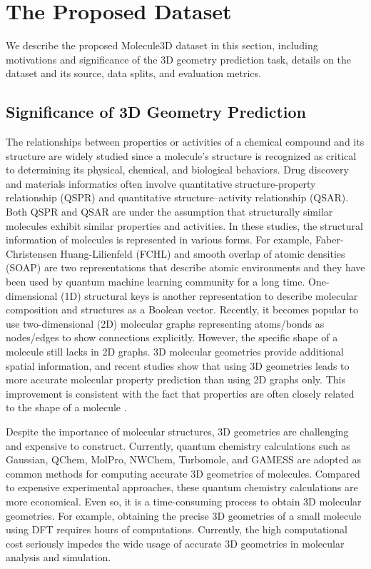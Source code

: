 \documentclass{article}
\begin{document}
\section{The Proposed Dataset}
We describe the proposed Molecule3D dataset in this section, including motivations and significance of the 3D geometry prediction task, details on the dataset and its source, data splits, and evaluation metrics.

\subsection{Significance of 3D Geometry Prediction}
The relationships between properties or activities of a chemical compound and its structure are widely studied since a molecule's structure is recognized as critical to determining its physical, chemical, and biological behaviors. Drug discovery and materials informatics often involve quantitative structure-property relationship (QSPR) and quantitative structure–activity relationship (QSAR). Both QSPR and QSAR are under the assumption that structurally similar molecules exhibit similar properties and activities. In these studies, the structural information of molecules is represented in various forms. For example, Faber-Christensen Huang-Lilienfeld (FCHL) \cite{christensen2020fchl} and smooth overlap of atomic densities (SOAP) \cite{bartok2013representing} are two representations that describe atomic environments and they have been used by quantum machine learning community for a long time. One-dimensional (1D) structural keys is another representation to describe molecular composition and structures as a Boolean vector. Recently, it becomes popular to use two-dimensional (2D) molecular graphs representing atoms/bonds as nodes/edges to show connections explicitly. However, the specific shape of a molecule still lacks in 2D graphs. 3D molecular geometries provide additional spatial information, and recent studies show that using 3D geometries leads to more accurate molecular property prediction than using 2D graphs only. This improvement is consistent with the fact that properties are often closely related to the shape of a molecule \cite{engel2018applied}.

Despite the importance of molecular structures, 3D geometries are challenging and expensive to construct. Currently, quantum chemistry calculations such as Gaussian, QChem, MolPro, NWChem, Turbomole, and GAMESS are adopted as common methods for computing accurate 3D geometries of molecules. Compared to expensive experimental approaches, these quantum chemistry calculations are more economical. Even so, it is a time-consuming process to obtain 3D molecular geometries. For example, obtaining the precise 3D geometries of a small molecule using DFT requires hours of computations. Currently, the high computational cost seriously impedes the wide usage of accurate 3D geometries in molecular analysis and simulation.
\end{document}
